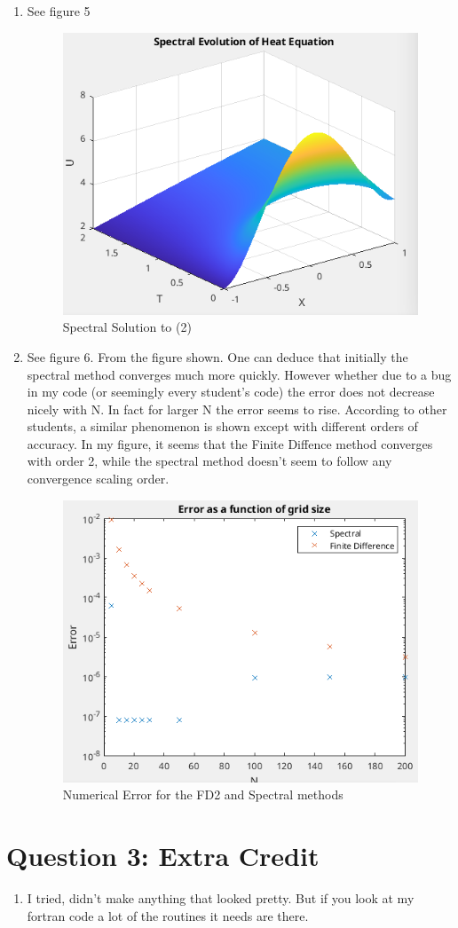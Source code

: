 \documentclass{article}
\begin{document}
\begin{enumerate}[label=\alph*)]
    \item See figure 5
    \begin{figure}[ht]
        \centering
        \includegraphics[width=.5\textwidth]{q2_gcl_sol.png}
        \caption{Spectral Solution to (2)}
    \end{figure}

    \item See figure 6. From the figure shown. One can deduce that initially the
    spectral method converges much more quickly. However whether due to a bug in
    my code (or seemingly every student's code) the error does not decrease
    nicely with N. In fact for larger N the error seems to rise. According to
    other students, a similar phenomenon is shown except with different orders
    of accuracy. In my figure, it seems that the Finite Diffence method
    converges with order 2, while the spectral method doesn't seem to follow any
    convergence scaling order. 
    \begin{figure}[ht]
        \centering
        \includegraphics[width=.5\textwidth]{q2_error.png}
        \caption{Numerical Error for the FD2 and Spectral methods}
    \end{figure}

\end{enumerate}

\section*{Question 3: Extra Credit}

\begin{enumerate}[label=\alph*)]

    \item     I tried, didn't make anything that looked pretty. But if you look
    at my fortran code a lot of the routines it needs are there. 
\end{enumerate}
\end{document}
